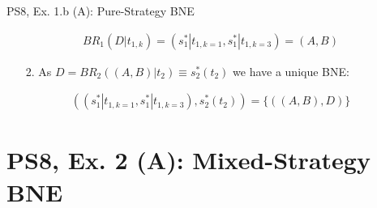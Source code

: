 \begin{frame}{PS8, Ex. 1.b (A): Pure-Strategy BNE}
\begin{multicols}{2}
      \begin{align*}
        BR_1\left(D|t_{1,k}\right)=(s_1^*|t_{1,k=1},s_1^*|t_{1,k=3})=(A,B)
      \end{align*}
      \vspace{-16pt}
      \begin{enumerate}
        \item[2.] As $D=BR_2\left((A,B)|t_2\right)\equiv s_2^*(t_2)$ we have a unique BNE:
      \end{enumerate}
      \vspace{-8pt}
      \begin{align*}
        \left((s_1^*|t_{1,k=1},s_1^*|t_{1,k=3}),s_2^*(t_2)\right)=\{((A,B),D)\}
      \end{align*}
      \vfill\null
    \end{multicols}
\end{frame}


\section{PS8, Ex. 2 (A): Mixed-Strategy BNE}

